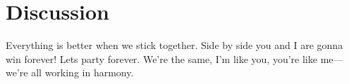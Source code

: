 \chapter{Discussion}
\label{toc:discussion}
Everything is better when we stick together.
Side by side you and I are gonna win forever!
Lets party forever.
We're the same, I'm like you, you're like me---we're all working in harmony.
